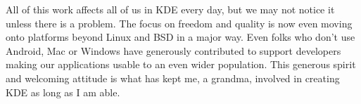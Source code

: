 All of this work affects all of us in KDE every day, but we may not notice it unless there is a problem. The focus on freedom and quality is now even moving onto platforms beyond Linux and BSD in a major way. Even folks who don't use Android, Mac or Windows have generously contributed to support developers making our applications usable to an even wider population. This generous spirit and welcoming attitude is what has kept me, a grandma, involved in creating KDE as long as I am able.
